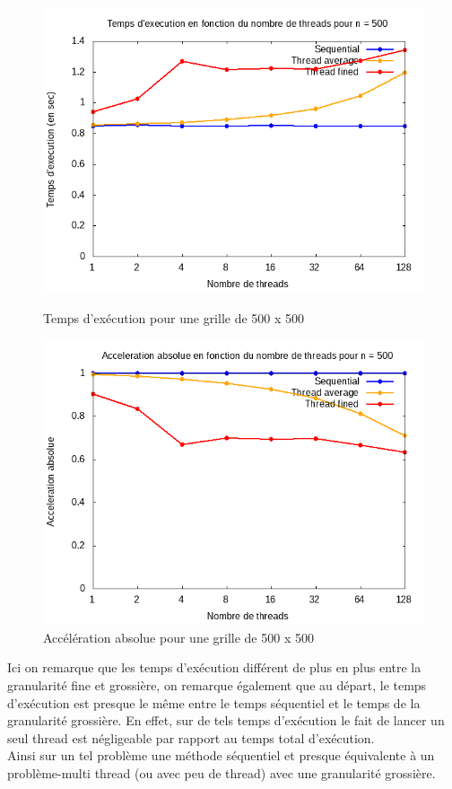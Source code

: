 \documentclass[10pt,a4paper]{article}
\begin{document}
\newpage
\begin{figure}[h]
  \centering
  \begin{minipage}[b]{0.49\textwidth}
	\includegraphics[width=\textwidth]{./Time/size_500_time.png}
    \caption{Temps d'exécution pour une grille de 500 x 500}
  \end{minipage}
  \hfill
  \begin{minipage}[b]{0.49\textwidth}
    \includegraphics[width=\textwidth]{./Time/size_500_acceleration.png}
    \caption{Accélération absolue pour une grille de 500 x 500}
  \end{minipage}
\end{figure}
Ici on remarque que les temps d'exécution différent de plus en plus entre la granularité fine et grossière, on remarque également que au départ, le temps d'exécution est presque le même entre le temps séquentiel et le temps de la granularité grossière. En effet, sur de tels temps d'exécution le fait de lancer un seul thread est négligeable par rapport au temps total d'exécution.\\
Ainsi sur un tel problème une méthode séquentiel et presque équivalente à un problème-multi thread (ou avec peu de thread) avec une granularité grossière. \\
\end{document}
